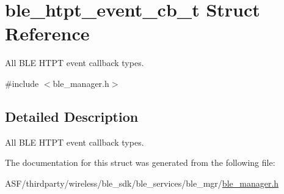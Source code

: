 \hypertarget{structble__htpt__event__cb__t}{}\section{ble\+\_\+htpt\+\_\+event\+\_\+cb\+\_\+t Struct Reference}
\label{structble__htpt__event__cb__t}


All B\+LE H\+T\+PT event callback types.  




{\ttfamily \#include $<$ble\+\_\+manager.\+h$>$}



\subsection{Detailed Description}
All B\+LE H\+T\+PT event callback types. 

The documentation for this struct was generated from the following file\+:\begin{DoxyCompactItemize}
\item 
A\+S\+F/thirdparty/wireless/ble\+\_\+sdk/ble\+\_\+services/ble\+\_\+mgr/\mbox{\hyperlink{ble__manager_8h}{ble\+\_\+manager.\+h}}\end{DoxyCompactItemize}
